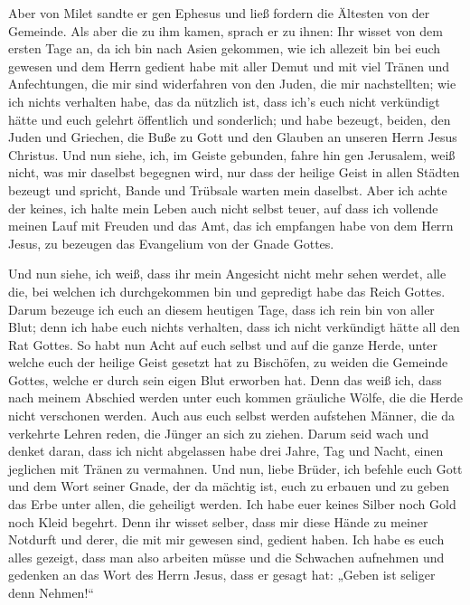  Aber von Milet sandte er gen Ephesus und ließ fordern
die Ältesten von der Gemeinde.  Als aber die zu ihm
kamen, sprach er zu ihnen: Ihr wisset von dem ersten Tage an, da ich bin
nach Asien gekommen, wie ich allezeit bin bei euch gewesen
 und dem Herrn gedient habe mit aller Demut und mit viel
Tränen und Anfechtungen, die mir sind widerfahren von den Juden, die mir
nachstellten;  wie ich nichts verhalten habe, das da
nützlich ist, dass ich's euch nicht verkündigt hätte und euch gelehrt
öffentlich und sonderlich;  und habe bezeugt, beiden, den
Juden und Griechen, die Buße zu Gott und den Glauben an unseren Herrn
Jesus Christus.  Und nun siehe, ich, im Geiste gebunden,
fahre hin gen Jerusalem, weiß nicht, was mir daselbst begegnen wird,
 nur dass der heilige Geist in allen Städten bezeugt und
spricht, Bande und Trübsale warten mein daselbst.  Aber
ich achte der keines, ich halte mein Leben auch nicht selbst teuer, auf
dass ich vollende meinen Lauf mit Freuden und das Amt, das ich empfangen
habe von dem Herrn Jesus, zu bezeugen das Evangelium von der Gnade
Gottes.

 Und nun siehe, ich weiß, dass ihr mein Angesicht nicht
mehr sehen werdet, alle die, bei welchen ich durchgekommen bin und
gepredigt habe das Reich Gottes.  Darum bezeuge ich euch
an diesem heutigen Tage, dass ich rein bin von aller Blut;
 denn ich habe euch nichts verhalten, dass ich nicht
verkündigt hätte all den Rat Gottes.  So habt nun Acht
auf euch selbst und auf die ganze Herde, unter welche euch der heilige
Geist gesetzt hat zu Bischöfen, zu weiden die Gemeinde Gottes, welche er
durch sein eigen Blut erworben hat.  Denn das weiß ich,
dass nach meinem Abschied werden unter euch kommen gräuliche Wölfe, die
die Herde nicht verschonen werden.  Auch aus euch selbst
werden aufstehen Männer, die da verkehrte Lehren reden, die Jünger an
sich zu ziehen.  Darum seid wach und denket daran, dass
ich nicht abgelassen habe drei Jahre, Tag und Nacht, einen jeglichen mit
Tränen zu vermahnen.  Und nun, liebe Brüder, ich befehle
euch Gott und dem Wort seiner Gnade, der da mächtig ist, euch zu erbauen
und zu geben das Erbe unter allen, die geheiligt werden. 
Ich habe euer keines Silber noch Gold noch Kleid begehrt.
 Denn ihr wisset selber, dass mir diese Hände zu meiner
Notdurft und derer, die mit mir gewesen sind, gedient haben.
 Ich habe es euch alles gezeigt, dass man also arbeiten
müsse und die Schwachen aufnehmen und gedenken an das Wort des Herrn
Jesus, dass er gesagt hat: „Geben ist seliger denn Nehmen!{}``

